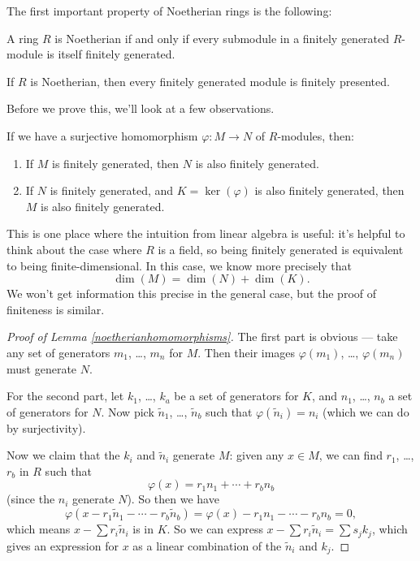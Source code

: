 The first important property of Noetherian rings is the following:

\begin{proposition}\label{noetheriansubmodules}
    A ring $R$ is Noetherian if and only if every submodule in a finitely generated $R$-module is itself finitely generated. 
\end{proposition}

\begin{corollary}\label{finpresented}
    If $R$ is Noetherian, then every finitely generated module is finitely presented. 
\end{corollary}

Before we prove this, we'll look at a few observations. 

\begin{lemma} \label{noetherianhomomorphisms}
    If we have a surjective homomorphism $\varphi : M \to N$ of $R$-modules, then:
    \begin{enumerate}
        \item If $M$ is finitely generated, then $N$ is also finitely generated. 
        \item If $N$ is finitely generated, and $K = \ker(\varphi)$ is also finitely generated, then $M$ is also finitely generated. 
    \end{enumerate}
\end{lemma}

\begin{note}
    This is one place where the intuition from linear algebra is useful: it's helpful to think about the case where $R$ is a field, so being finitely generated is equivalent to being finite-dimensional. In this case, we know more precisely that \[\dim(M) = \dim(N) + \dim(K).\] We won't get information this precise in the general case, but the proof of finiteness is similar. 
\end{note}

\begin{proof}[Proof of Lemma \ref{noetherianhomomorphisms}]
    The first part is obvious --- take any set of generators $m_1$, \ldots, $m_n$ for $M$. Then their images $\varphi(m_1)$, \ldots, $\varphi(m_n)$ must generate $N$. 

    For the second part, let $k_1$, \ldots, $k_a$ be a set of generators for $K$, and $n_1$, \ldots, $n_b$ a set of generators for $N$. Now pick $\tilde{n}_1$, \ldots, $\tilde{n}_b$ such that $\varphi(\tilde{n}_i) = n_i$ (which we can do by surjectivity). 

    Now we claim that the $k_i$ and $\tilde{n}_i$ generate $M$: given any $x \in M$, we can find $r_1$, \ldots, $r_b$ in $R$ such that \[\varphi(x) = r_1n_1 + \cdots + r_bn_b\] (since the $n_i$ generate $N$). So then we have \[\varphi(x - r_1\tilde{n}_1 - \cdots - r_b\tilde{n}_b) = \varphi(x) - r_1n_1 - \cdots - r_bn_b = 0,\] which means $x - \sum r_i\tilde{n}_i$ is in $K$. So we can express $x - \sum r_i\tilde{n}_i = \sum s_jk_j$, which gives an expression for $x$ as a linear combination of the $\tilde{n}_i$ and $k_j$. 
\end{proof}

